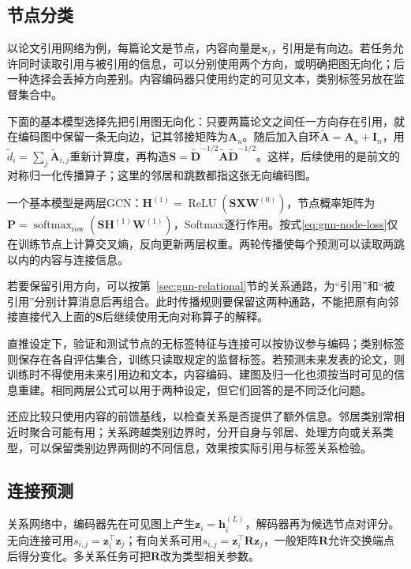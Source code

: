 \subsection{节点分类}
\label{sec:gnn-application-node}

以论文引用网络为例，每篇论文是节点，内容向量是$\bm{x}_i$，引用是有向边。若任务允许同时读取引用与被引用的信息，可以分别使用两个方向，或明确把图无向化；后一种选择会丢掉方向差别。内容编码器只使用约定的可见文本，类别标签另放在监督集合中。

下面的基本模型选择先把引用图无向化：只要两篇论文之间任一方向存在引用，就在编码图中保留一条无向边，记其邻接矩阵为$\bm A_u$。随后加入自环$\widetilde{\bm A}=\bm A_u+\bm I_n$，用$\widetilde d_i=\sum_j\widetilde{\bm A}_{i,j}$重新计算度，再构造$\bm S=\widetilde{\bm D}^{-1/2}\widetilde{\bm A}\widetilde{\bm D}^{-1/2}$。这样，后续使用的是前文的对称归一化传播算子；这里的邻居和跳数都指这张无向编码图。

一个基本模型是两层GCN：$\bm{H}^{(1)}=\operatorname{ReLU}(\bm{S}\bm{X}\bm{W}^{(0)})$，节点概率矩阵为$\bm{P}=\operatorname{softmax}_{\mathrm{row}}(\bm{S}\bm{H}^{(1)}\bm{W}^{(1)})$，Softmax逐行作用。按式\eqref{eq:gnn-node-loss}仅在训练节点上计算交叉熵，反向更新两层权重。两轮传播使每个预测可以读取两跳以内的内容与连接信息。

若要保留引用方向，可以按第~\ref{sec:gnn-relational}节的关系通路，为“引用”和“被引用”分别计算消息后再组合。此时传播规则要保留这两种通路，不能把原有向邻接直接代入上面的$\bm S$后继续使用无向对称算子的解释。

直推设定下，验证和测试节点的无标签特征与连接可以按协议参与编码；类别标签则保存在各自评估集合，训练只读取规定的监督标签。若预测未来发表的论文，则训练时不得使用未来引用边和文本，内容编码、建图及归一化也须按当时可见的信息重建。相同两层公式可以用于两种设定，但它们回答的是不同泛化问题。

还应比较只使用内容的前馈基线，以检查关系是否提供了额外信息。邻居类别常相近时聚合可能有用；关系跨越类别边界时，分开自身与邻居、处理方向或关系类型，可以保留类别边界两侧的不同信息，效果按实际引用与标签关系检验。

\subsection{连接预测}
\label{sec:gnn-application-link}

关系网络中，编码器先在可见图上产生$\bm{z}_i=\bm{h}_i^{(L)}$，解码器再为候选节点对评分。无向连接可用$s_{i,j}=\bm{z}_i^{\top}\bm{z}_j$；有向关系可用$s_{i,j}=\bm{z}_i^{\top}\bm{R}\bm{z}_j$，一般矩阵$\bm{R}$允许交换端点后得分变化。多关系任务可把$\bm{R}$改为类型相关参数。

